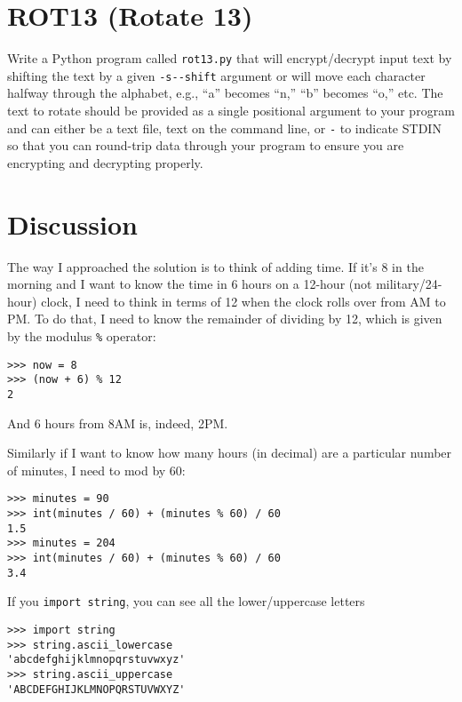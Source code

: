 \documentclass[]{article}
\begin{document}
\hypertarget{rot13-rotate-13}{%
\section{ROT13 (Rotate 13)}\label{rot13-rotate-13}}

Write a Python program called \texttt{rot13.py} that will
encrypt/decrypt input text by shifting the text by a given
\texttt{-s\textbar{}-\/-shift} argument or will move each character
halfway through the alphabet, e.g., ``a'' becomes ``n,'' ``b'' becomes
``o,'' etc. The text to rotate should be provided as a single positional
argument to your program and can either be a text file, text on the
command line, or \texttt{-} to indicate STDIN so that you can round-trip
data through your program to ensure you are encrypting and decrypting
properly.

\hypertarget{discussion-1}{%
\section{Discussion}\label{discussion-1}}

The way I approached the solution is to think of adding time. If it's 8
in the morning and I want to know the time in 6 hours on a 12-hour (not
military/24-hour) clock, I need to think in terms of 12 when the clock
rolls over from AM to PM. To do that, I need to know the remainder of
dividing by 12, which is given by the modulus \texttt{\%} operator:

\begin{verbatim}
>>> now = 8
>>> (now + 6) % 12
2
\end{verbatim}

And 6 hours from 8AM is, indeed, 2PM.

Similarly if I want to know how many hours (in decimal) are a particular
number of minutes, I need to mod by 60:

\begin{verbatim}
>>> minutes = 90
>>> int(minutes / 60) + (minutes % 60) / 60
1.5
>>> minutes = 204
>>> int(minutes / 60) + (minutes % 60) / 60
3.4
\end{verbatim}

If you \texttt{import\ string}, you can see all the lower/uppercase
letters

\begin{verbatim}
>>> import string
>>> string.ascii_lowercase
'abcdefghijklmnopqrstuvwxyz'
>>> string.ascii_uppercase
'ABCDEFGHIJKLMNOPQRSTUVWXYZ'
\end{verbatim}
\end{document}
